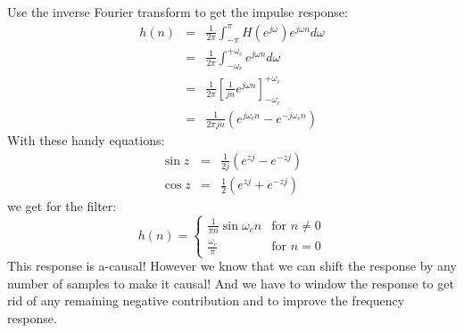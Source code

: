 \documentclass[12pt,a4paper]{article}
\begin{document}
Use the inverse Fourier transform to get the impulse response:
\begin{eqnarray}
h(n) & = & \frac{1}{2 \pi} \int_{-\pi}^{\pi} H(e^{j \omega}) e^{j \omega n} d\omega \\
     & = & \frac{1}{2 \pi} \int_{- \omega_{c}}^{+ \omega_{c}} e^{j \omega n} d\omega \\
     & = & \frac{1}{2 \pi} \left[\frac{1}{jn} e^{j \omega n} \right]_{- \omega_{c}}^{+ \omega_{c}} \\
     & = & \frac{1}{2 \pi jn} \left( e^{j \omega_{c} n} - e^{-j \omega_{c}n} \right)
\end{eqnarray}
With these handy equations:
\begin{eqnarray}
\sin z & = & \frac{1}{2j} (e^{zj} - e^{-zj})\\
\cos z & = & \frac{1}{2} (e^{zj} + e^{-zj})
\end{eqnarray}
we get for the filter:
\begin{equation}
h(n) = 
\left\{
\begin{array}{cc}
\frac{1}{\pi n} \sin \omega_{c}n & \mbox{for } n \neq 0 \\
\frac{\omega_{c}}{\pi} & \mbox{for }n = 0
\end{array}
\right.
\end{equation}
This response is a-causal! However we know that we can shift the response 
by any number of samples to make it causal! And we have to window the
response to get rid of any remaining negative contribution and to
improve the frequency response.
\end{document}
